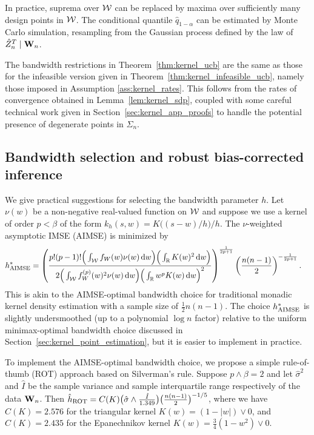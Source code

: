 In practice, suprema over $\mathcal{W}$ can be replaced by maxima over sufficiently
many design points in $\mathcal{W}$. The conditional quantile $\hat q_{1-\alpha}$ can
be estimated by Monte Carlo simulation, resampling from the Gaussian process
defined by the law of $\hat Z_n^T \mid \mathbf{W}_n$.

The bandwidth restrictions in Theorem~\ref{thm:kernel_ucb} are the same as
those for the infeasible version given in
Theorem~\ref{thm:kernel_infeasible_ucb},
namely those imposed in Assumption \ref{ass:kernel_rates}. This follows from
the rates
of convergence obtained in Lemma~\ref{lem:kernel_sdp}, coupled with some careful
technical work given in Section~\ref{sec:kernel_app_proofs} to handle the
potential
presence of degenerate points in $\Sigma_n$.

\subsection{Bandwidth selection and robust bias-corrected inference}
\label{sec:kernel_bandwidth_selection}

We give practical suggestions for selecting the bandwidth parameter $h$.
Let $\nu(w)$ be a non-negative real-valued function on $\mathcal{W}$ and suppose we use
a kernel of order $p < \beta$ of the form $k_h(s,w) = K\big((s-w) / h\big)/h$.
The $\nu$-weighted asymptotic IMSE (AIMSE) is minimized by
%
\begin{align*}
  h^*_{\operatorname{AIMSE}}
  &=
  \left(
    \frac{p!(p-1)!
      \Big(\int_{\mathcal{W}} f_W(w) \nu(w) \,\mathrm{d}w\Big)
    \Big(\int_{\mathbb{R}} K(w)^2 \,\mathrm{d}w\Big)}
    {2 \Big(
        \int_{\mathcal{W}}
        f_W^{(p)}(w)^2
        \nu(w)
        \,\mathrm{d}w
      \Big)
      \Big(
        \int_{\mathbb{R}}
        w^p K(w)
        \,\mathrm{d}w
      \Big)^2
    }
  \right)^{\frac{1}{2p+1}}
  \left( \frac{n(n-1)}{2} \right)^{-\frac{1}{2p+1}}.
\end{align*}
%
This is akin to the AIMSE-optimal bandwidth choice for traditional monadic
kernel density estimation with a sample size of $\frac{1}{2}n(n-1)$. The choice
$h^*_{\operatorname{AIMSE}}$ is slightly undersmoothed (up to a polynomial $\log n$ factor)
relative to the uniform minimax-optimal bandwidth choice discussed in
Section~\ref{sec:kernel_point_estimation}, but it is easier to implement in
practice.

To implement the AIMSE-optimal bandwidth choice, we propose a simple
rule-of-thumb (ROT) approach based on Silverman's rule.
Suppose $p\wedge\beta=2$ and let $\hat\sigma^2$ and $\hat I$
be the sample variance and sample interquartile range respectively
of the data $\mathbf{W}_n$. Then
$\hat{h}_{\operatorname{ROT}} = C(K) \big( \hat\sigma \wedge
\frac{\hat I}{1.349} \big) \big(\frac{n(n-1)}{2} \big)^{-1/5}$,
where we have $C(K)=2.576$ for the triangular kernel $K(w) = (1 - |w|) \vee 0$,
and $C(K)=2.435$ for the Epanechnikov kernel
$K(w) = \frac{3}{4}(1 - w^2) \vee 0$.

